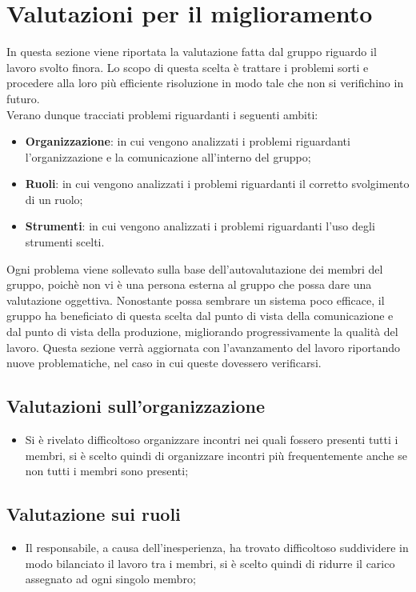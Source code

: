 \section{Valutazioni per il miglioramento}
In questa sezione viene riportata la valutazione fatta dal gruppo riguardo il 
lavoro svolto finora. Lo scopo di questa scelta è trattare i problemi sorti e
procedere alla loro più efficiente risoluzione in modo tale che non si verifichino
in futuro. \\
Verano dunque tracciati problemi riguardanti i seguenti ambiti:

\begin{itemize}
	\item \textbf{Organizzazione}: in cui vengono analizzati i problemi riguardanti 
		l'organizzazione e la comunicazione all'interno del gruppo;
	\item \textbf{Ruoli}: in cui vengono analizzati i problemi riguardanti il 
		corretto svolgimento di un ruolo;
	\item \textbf{Strumenti}: in cui vengono analizzati i problemi riguardanti 
		l'uso degli strumenti scelti.
\end{itemize}

\noindent Ogni problema viene sollevato sulla base dell'autovalutazione dei membri del 
gruppo, poichè non vi è una persona esterna al gruppo che possa dare una valutazione
oggettiva. Nonostante possa sembrare un sistema poco efficace, il gruppo ha 
beneficiato di questa scelta dal punto di vista della comunicazione e dal punto di
vista della produzione, migliorando progressivamente la qualità del lavoro.
Questa sezione verrà aggiornata con l'avanzamento del lavoro riportando nuove 
problematiche, nel caso in cui queste dovessero verificarsi.

\subsection{Valutazioni sull'organizzazione}
\begin{itemize}
\item Si è rivelato difficoltoso organizzare incontri nei quali fossero presenti tutti i membri, si è scelto quindi di organizzare incontri più frequentemente anche se non tutti i membri sono presenti;
\end{itemize}
\subsection{Valutazione sui ruoli}
\begin{itemize}
\item Il responsabile, a causa dell'inesperienza, ha trovato difficoltoso suddividere in modo bilanciato il lavoro tra i membri, si è scelto quindi di ridurre il carico assegnato ad ogni singolo membro;
\end{itemize}
